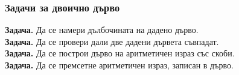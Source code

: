 \documentclass[alsotrans,beameroptions={aspectratio=169}]{beamerswitch}
\begin{document}
\begin{frame}
  \frametitle{Задачи за двоично дърво}
  \textbf{Задача.} Да се намери дълбочината на дадено дърво.\\[4ex]\pause
  \textbf{Задача.} Да се провери дали две дадени дървета съвпадат.\\[4ex]\pause
  \textbf{Задача.} Да се построи дърво на аритметичен израз със скоби.\\[4ex]\pause
  \textbf{Задача.} Да се премсетне аритметичен израз, записан в дърво.\\[4ex]
\end{frame}
\end{document}
